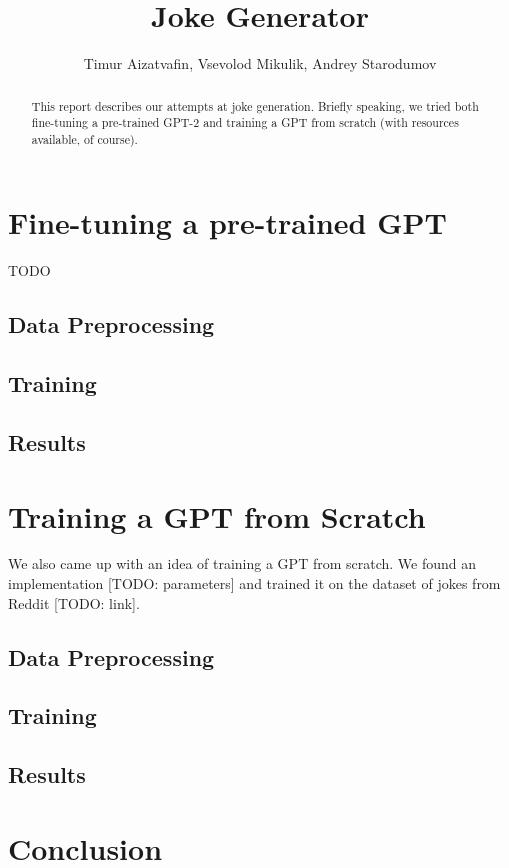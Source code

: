 \documentclass[12pt]{article}
\begin{document}
\title{Joke Generator}
\author{Timur Aizatvafin, Vsevolod Mikulik, Andrey Starodumov}

\maketitle

\begin{abstract}
	This report describes our attempts at joke generation. Briefly speaking, we tried both fine-tuning a pre-trained GPT-2 and
    training a GPT from scratch (with resources available, of course).
\end{abstract}

\section{Fine-tuning a pre-trained GPT}
	TODO
    
\subsection{Data Preprocessing}

\subsection{Training}

\subsection{Results}

\section{Training a GPT from Scratch}

We also came up with an idea of training a GPT from scratch. We found an implementation [TODO: parameters] and trained it on the dataset
of jokes from Reddit [TODO: link].

\subsection{Data Preprocessing}

\subsection{Training}

\subsection{Results}

\section{Conclusion}
\end{document}
